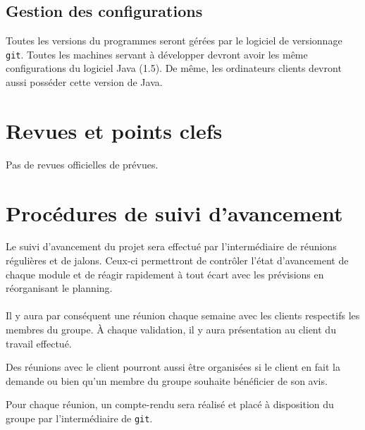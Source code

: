 \documentclass[a4paper,11pt,french]{article}
\begin{document}
\subsection{Gestion des configurations}
Toutes les versions du programmes seront gérées par le logiciel de versionnage 
\texttt{git}. Toutes les machines servant à développer devront
avoir les même configurations du logiciel Java (1.5). De même, les 
ordinateurs clients devront aussi posséder cette version de Java.

\section{Revues et points clefs}
Pas de revues officielles de prévues.

\section{Procédures de suivi d'avancement}
Le suivi d'avancement du projet sera effectué par l'intermédiaire de réunions
régulières et de jalons. Ceux-ci permettront de contrôler l'état d'avancement
de chaque module et de réagir rapidement à tout écart avec les prévisions en
réorganisant le planning.

\paragraph{}
Il y aura par conséquent une réunion chaque semaine avec les clients respectifs
les membres du groupe. À chaque validation, il y aura présentation au client du 
travail effectué.

Des réunions avec le client pourront aussi être organisées si le client en fait
la demande ou bien qu'un membre du groupe souhaite bénéficier de son avis.

Pour chaque réunion, un compte-rendu sera réalisé et placé à disposition du
groupe par l'intermédiaire de \texttt{git}.
\end{document}
